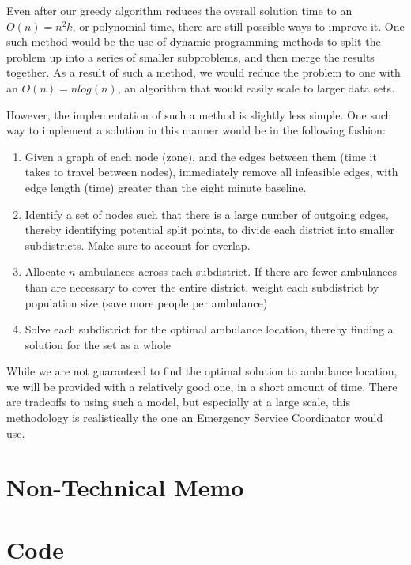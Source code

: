 \documentclass[notitlepage, 12pt]{article}
\begin{document}
Even after our greedy algorithm reduces the overall solution time to an $O(n) = n^2k$, or polynomial time, there are still possible ways to improve it. One such method would be the use of dynamic programming methods to split the problem up into a series of smaller subproblems, and then merge the results together. As a result of such a method, we would reduce the problem to one with an $O(n) = nlog(n)$, an algorithm that would easily scale to larger data sets.

However, the implementation of such a method is slightly less simple. One such way to implement a solution in this manner would be in the following fashion:

\begin{enumerate}
\item Given a graph of each node (zone), and the edges between them (time it takes to travel between nodes), immediately remove all infeasible edges, with edge length (time) greater than the eight minute baseline.

\item Identify a set of nodes such that there is a large number of outgoing edges, thereby identifying potential split points, to divide each district into smaller subdistricts. Make sure to account for overlap.

\item Allocate $n$ ambulances across each subdistrict. If there are fewer ambulances than are necessary to cover the entire district, weight each subdistrict by population size (save more people per ambulance)

\item Solve each subdistrict for the optimal ambulance location, thereby finding a solution for the set as a whole
\end{enumerate}

While we are not guaranteed to find the optimal solution to ambulance location, we will be provided with a relatively good one, in a short amount of time. There are tradeoffs to using such a model, but especially at a large scale, this methodology is realistically the one an Emergency Service Coordinator would use.

\section{Non-Technical Memo}

\appendix
\section{Code}







\end{document}
